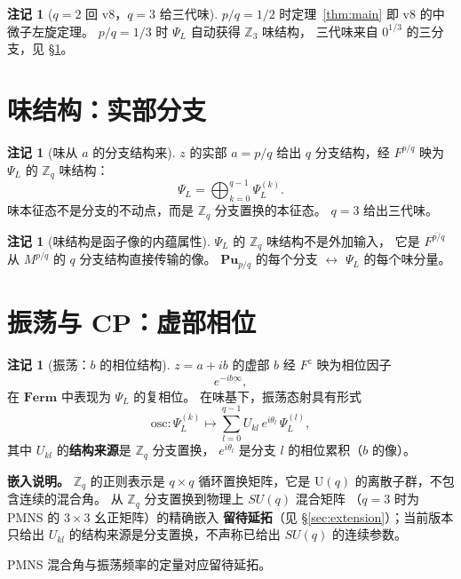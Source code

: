 \documentclass[11pt]{ctexart}
\theoremstyle{plain}
\theoremstyle{definition}
\newtheorem{rem}[thm]{注记}
\newcommand{\Cat}{\mathbf}
\begin{document}
\begin{rem}[$q=2$ 回 v8，$q=3$ 给三代味]\label{rem:qcases}
$p/q = 1/2$ 时定理~\ref{thm:main} 即 v8 的中微子左旋定理。
$p/q = 1/3$ 时 $\Psi_L$ 自动获得 $\mathbb{Z}_3$ 味结构，
三代味来自 $0^{1/3}$ 的三分支，见 \S\ref{sec:flavor}。
\end{rem}

\section{味结构：实部分支}\label{sec:flavor}

\begin{rem}[味从 $a$ 的分支结构来]\label{rem:flavor}
$z$ 的实部 $a = p/q$ 给出 $q$ 分支结构，经 $F^{p/q}$ 映为 $\Psi_L$
的 $\mathbb{Z}_q$ 味结构：
\[
\Psi_L = \bigoplus_{k=0}^{q-1} \Psi_L^{(k)}.
\]
味本征态不是分支的不动点，而是 $\mathbb{Z}_q$ 分支置换的本征态。
$q=3$ 给出三代味。
\end{rem}

\begin{rem}[味结构是函子像的内蕴属性]\label{rem:flavorfrom}
$\Psi_L$ 的 $\mathbb{Z}_q$ 味结构不是外加输入，
它是 $F^{p/q}$ 从 $M^{p/q}$ 的 $q$ 分支结构直接传输的像。
$\Cat{Pu}_{p/q}$ 的每个分支 $\leftrightarrow$ $\Psi_L$ 的每个味分量。
\end{rem}

\section{振荡与 CP：虚部相位}\label{sec:osc}

\begin{rem}[振荡：$b$ 的相位结构]\label{rem:osc}
$z = a+ib$ 的虚部 $b$ 经 $F^z$ 映为相位因子
\[
e^{-ib\infty},
\]
在 $\Cat{Ferm}$ 中表现为 $\Psi_L$ 的复相位。
在味基下，振荡态射具有形式
\[
\mathrm{osc}: \Psi_L^{(k)} \longmapsto \sum_{l=0}^{q-1}
U_{kl}\, e^{i\theta_l}\,\Psi_L^{(l)},
\]
其中 $U_{kl}$ 的\textbf{结构来源}是 $\mathbb{Z}_q$ 分支置换，
$e^{i\theta_l}$ 是分支 $l$ 的相位累积（$b$ 的像）。

\textbf{嵌入说明。} $\mathbb{Z}_q$ 的正则表示是 $q\times q$
循环置换矩阵，它是 $\mathrm{U}(q)$ 的离散子群，不包含连续的混合角。
从 $\mathbb{Z}_q$ 分支置换到物理上 $SU(q)$ 混合矩阵
（$q=3$ 时为 PMNS 的 $3\times 3$ 幺正矩阵）的精确嵌入
\textbf{留待延拓}（见 \S\ref{sec:extension}）；当前版本只给出
$U_{kl}$ 的结构来源是分支置换，不声称已给出 $SU(q)$ 的连续参数。

PMNS 混合角与振荡频率的定量对应留待延拓。
\end{rem}
\end{document}
